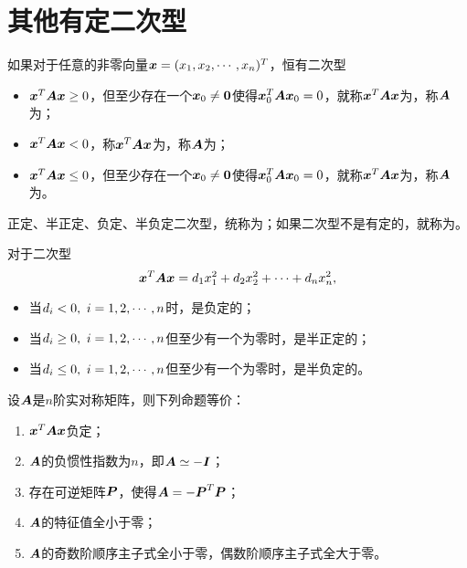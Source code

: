 \section{其他有定二次型}

\begin{frame}
   \begin{dingyi}
     如果对于任意的非零向量${\boldsymbol{x}}=(x_1,x_2,\cdots,x_n)^T$，恒有二次型
     \begin{itemize}
     \item ${\boldsymbol{x}}^T\boldsymbol{A}{\boldsymbol{x}}\ge0$，但至少存在一个$\vx_0\ne \M0$使得${\boldsymbol{x}}_0^T\boldsymbol{A}{\boldsymbol{x}}_0=0$，就称${\boldsymbol{x}}^T\boldsymbol{A}{\boldsymbol{x}}$为，称$\boldsymbol{A}$为；\\[.1in]
     \item ${\boldsymbol{x}}^T\boldsymbol{A}{\boldsymbol{x}}<0$，称${\boldsymbol{x}}^T\boldsymbol{A}{\boldsymbol{x}}$为，称$\boldsymbol{A}$为；
     \item ${\boldsymbol{x}}^T\boldsymbol{A}{\boldsymbol{x}}\le0$，但至少存在一个$\vx_0\ne \M0$使得${\boldsymbol{x}}_0^T\boldsymbol{A}{\boldsymbol{x}}_0=0$，就称${\boldsymbol{x}}^T\boldsymbol{A}{\boldsymbol{x}}$为，称$\boldsymbol{A}$为。
     \end{itemize}     
    \end{dingyi}

    \vspace{.1in}\pause 
    正定、半正定、负定、半负定二次型，统称为；如果二次型不是有定的，就称为。
\end{frame}

\begin{frame}
  \begin{li}
    对于二次型
    $$
    {\boldsymbol{x}}^T\boldsymbol{A}{\boldsymbol{x}}=d_1x_1^2+d_2x_2^2+\cdots+d_nx_n^2,
    $$
    \begin{itemize}
      \item 当$d_i<0, ~i=1,2,\cdots,n$时，是负定的；\\[.1in]
      \item 当$d_i\ge0, ~i=1,2,\cdots,n$但至少有一个为零时，是半正定的；\\[.1in]
      \item 当$d_i\le0, ~i=1,2,\cdots,n$但至少有一个为零时，是半负定的。
    \end{itemize}
  \end{li}
\end{frame}

\begin{frame}
  \begin{dingli}
    设$\boldsymbol{A}$是$n$阶实对称矩阵，则下列命题等价：
    \begin{enumerate}
    \item ${\boldsymbol{x}}^T\boldsymbol{A}{\boldsymbol{x}}$负定；\\[.1in]
    \item $\boldsymbol{A}$的负惯性指数为$n$，即$\boldsymbol{A}\simeq -\boldsymbol{I}$；\\[.1in]
    \item 存在可逆矩阵$\boldsymbol{P}$，使得$\boldsymbol{A}=-\boldsymbol{P}^T\boldsymbol{P}$；\\[.1in]
    \item $\boldsymbol{A}$的特征值全小于零；\\[.1in]
    \item $\boldsymbol{A}$的奇数阶顺序主子式全小于零，偶数阶顺序主子式全大于零。
    \end{enumerate}
  \end{dingli}
\end{frame}

